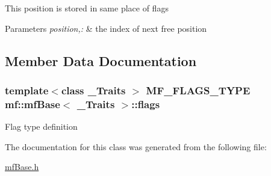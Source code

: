 This position is stored in same place of flags


\begin{DoxyParams}{Parameters}
{\em position,:} & the index of next free position \\
\hline
\end{DoxyParams}


\subsection{Member Data Documentation}
\hypertarget{classmf_1_1mfBase_a3551780d0be3b33270adbb3726d6e2d9}{
\subsubsection[{flags}]{\setlength{\rightskip}{0pt plus 5cm}template$<$class \_\-Traits $>$ MF\_\-FLAGS\_\-TYPE {\bf mf::mfBase}$<$ \_\-Traits $>$::{\bf flags}}}
\label{classmf_1_1mfBase_a3551780d0be3b33270adbb3726d6e2d9}
Flag type definition 

The documentation for this class was generated from the following file:\begin{DoxyCompactItemize}
\item 
\hyperlink{mfBase_8h}{mfBase.h}\end{DoxyCompactItemize}
